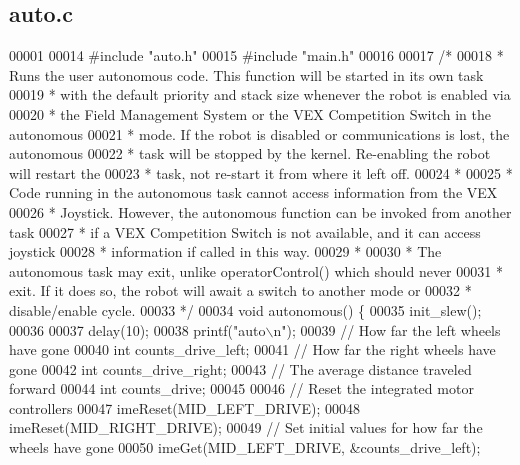 \subsection{auto.\+c}
\label{auto_8c_source}

\begin{DoxyCode}
00001 
00014 \textcolor{preprocessor}{#include "auto.h"}
00015 \textcolor{preprocessor}{#include "main.h"}
00016 
00017 \textcolor{comment}{/*}
00018 \textcolor{comment}{ * Runs the user autonomous code. This function will be started in its own task}
00019 \textcolor{comment}{ * with the default priority and stack size whenever the robot is enabled via}
00020 \textcolor{comment}{ * the Field Management System or the VEX Competition Switch in the autonomous}
00021 \textcolor{comment}{ * mode. If the robot is disabled or communications is lost,  the autonomous}
00022 \textcolor{comment}{ * task will be stopped by the kernel. Re-enabling the robot will restart the}
00023 \textcolor{comment}{ * task, not re-start it from where it left off.}
00024 \textcolor{comment}{ *}
00025 \textcolor{comment}{ * Code running in the autonomous task cannot access information from the VEX}
00026 \textcolor{comment}{ * Joystick. However, the autonomous function can be invoked from another task}
00027 \textcolor{comment}{ * if a VEX Competition Switch is not available, and it can access joystick}
00028 \textcolor{comment}{ * information if called in this way.}
00029 \textcolor{comment}{ *}
00030 \textcolor{comment}{ * The autonomous task may exit, unlike operatorControl() which should never}
00031 \textcolor{comment}{ * exit. If it does so, the robot will await a switch to another mode or}
00032 \textcolor{comment}{ * disable/enable cycle.}
00033 \textcolor{comment}{ */}
00034 \textcolor{keywordtype}{void} autonomous() \{
00035   init_slew();
00036 
00037   delay(10);
00038   printf(\textcolor{stringliteral}{"auto\(\backslash\)n"});
00039   \textcolor{comment}{// How far the left wheels have gone}
00040   \textcolor{keywordtype}{int} counts\_drive\_left;
00041   \textcolor{comment}{// How far the right wheels have gone}
00042   \textcolor{keywordtype}{int} counts\_drive\_right;
00043   \textcolor{comment}{// The average distance traveled forward}
00044   \textcolor{keywordtype}{int} counts\_drive;
00045 
00046   \textcolor{comment}{// Reset the integrated motor controllers}
00047   imeReset(MID_LEFT_DRIVE);
00048   imeReset(MID_RIGHT_DRIVE);
00049   \textcolor{comment}{// Set initial values for how far the wheels have gone}
00050   imeGet(MID_LEFT_DRIVE, &counts\_drive\_left);

\end{DoxyCode}
